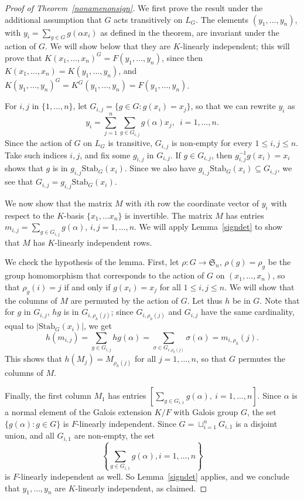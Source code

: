 \documentclass[12pt]{article}
\theoremstyle{plain}
\begin{document}
\begin{proof}[Proof of Theorem~\ref{nonamenonsign}]
  We first prove the result under the additional assumption that $G$ acts
  transitively on $L_G$.  The elements $(y_1,\dots,y_n)$, with $y_i =
  \sum_{g \in G} g(\alpha x_i)$ as defined in the theorem, are invariant under
  the action of $G$. We will show below that they are $K$-linearly
  independent; this will prove that
  $K(x_1,\dots,x_n)^G=F(y_1,\dots,y_n)$, since then
  $K(x_1,\dots,x_n)=K(y_1,\dots,y_n)$, and
  $K(y_1,\dots,y_n)^G=K^G(y_1,\dots,y_n)=F(y_1,\dots,y_n)$.

  For $i,j$ in $\{1,\dots,n\}$, let $G_{i,j}= \lbrace g \in G: g(x_i)
  = x_j \rbrace$, so that we can rewrite $y_i$ as $$y_i = \sum^n_{j
    =1}\sum_{g \in G_{i,j}}g(\alpha)x_j, \,\,\, i = 1, \ldots, n.$$
  Since the action of $G$ on $L_G$ is transitive, $G_{i,j}$ is
  non-empty for every $1 \leq i,j \leq n$.  Take such indices $i,j$,
  and fix some $g_{i,j}$ in $G_{i,j}$. If $g \in G_{i,j}$, then
  $g^{-1}_{i,j}g(x_i) = x_i$ shows that $g$ is in
  $g_{i,j}\mathrm{Stab}_G(x_i)$. Since we also have
  $g_{i,j}\mathrm{Stab}_G(x_i) \subseteq G_{i,j}$, we see that
  $G_{i,j} = g_{i,j}\mathrm{Stab}_G(x_i)$.


  We now show that the matrix $M$ with $i$th row the coordinate vector
  of $y_i$ with respect to the $K$-basis $\lbrace x_1, \ldots x_n
  \rbrace$ is invertible. The matrix $M$ has entries $m_{i,j} =
  \sum_{g \in G_{i,j}}g(\alpha)$, $i,j = 1, \ldots, n$. We will apply
  Lemma~\ref{signdet} to show that $M$ has $K$-linearly independent
  rows.

  We check the hypothesis of the lemma. First, let $\rho: G \to
  \mathfrak{S}_n$, $\rho(g) = \rho_g$ be the group homomorphism that
  corresponds to the action of $G$ on $(x_1, \ldots , x_n)$, so that
  $\rho_g(i) = j$ if and only if $g(x_i) = x_j$ for all $1 \leq
  i,j\leq n$. We will show that the columns of $M$ are permuted by the
  action of $G$. Let thus $h$ be in $G$. Note that for $g$ in
  $G_{i,j}$, $hg$ is in $G_{i,\rho_h(j)}$; since $G_{i,\rho_h(j)}$ and
  $G_{i,j}$ have the same cardinality, equal to
  $|\mathrm{Stab}_G(x_i)|$, we get
  $$h(m_{i,j}) = \sum_{g \in G_{i,j}}hg(\alpha) = \sum_{\sigma \in
    G_{i, \rho_{h}(j)}}\sigma (\alpha) = m_{i,\rho_{h}}(j).$$ This
  shows that $h(M_j) = M_{\rho_h(j)}$ for all $j = 1, \ldots, n$, so
  that $G$ permutes the columns of $M$. 
  
  Finally, the first column $M_1$ has entries $[ \sum_{g \in
      G_{i,1}}g(\alpha),\ i = 1, \ldots,n ].$ Since $\alpha$ is a
  normal element of the Galois extension $K/F$ with Galois group $G$,
  the set $\lbrace g(\alpha): g \in G \rbrace$ is $F$-linearly
  independent. Since $G = \sqcup^n_{i =1}G_{i,1}$ is a disjoint union,
  and all $G_{i,1}$ are non-empty,
  the set
  $$\left\lbrace \sum_{g \in G_{i,1}}g(\alpha), i = 1, \ldots, n \right\rbrace$$ is
  $F$-linearly independent as well.
  So Lemma~\ref{signdet} applies, and we conclude that $y_1, \ldots,
  y_n$ are $K$-linearly independent, as claimed.


\end{proof}
\end{document}
